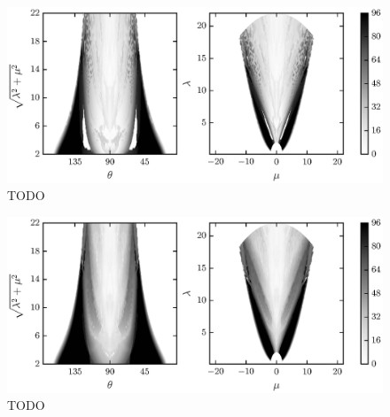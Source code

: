 	\begin{figure}
		\begin{center}
			\includegraphics{./fig/ch3/push/et0.1/grid.eps}
		\end{center}		
		\caption{ TODO
		\label{fig:PushGrid:et0.1}}
	\end{figure}

	\begin{figure}[t]
		\begin{center}
			\includegraphics{./fig/ch3/push/eb0.1_et0.1/grid.eps}
		\end{center}		
		\caption{ TODO
		\label{fig:PushGrid:eb0.1_et0.1}}
	\end{figure}	

